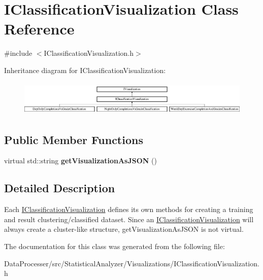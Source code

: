 \hypertarget{classIClassificationVisualization}{}\section{I\+Classification\+Visualization Class Reference}
\label{classIClassificationVisualization}


{\ttfamily \#include $<$I\+Classification\+Visualization.\+h$>$}

Inheritance diagram for I\+Classification\+Visualization\+:\begin{figure}[H]
\begin{center}
\leavevmode
\includegraphics[height=1.696970cm]{classIClassificationVisualization}
\end{center}
\end{figure}
\subsection*{Public Member Functions}
\begin{DoxyCompactItemize}
\item 
\mbox{\label{classIClassificationVisualization_a0ccbaa688c997957f8027a0ea74bcc6f}} 
virtual std\+::string {\bfseries get\+Visualization\+As\+J\+S\+ON} ()
\end{DoxyCompactItemize}


\subsection{Detailed Description}
Each \hyperlink{classIClassificationVisualization}{I\+Classification\+Visualization} defines its own methods for creating a training and result clustering/classified dataset. Since an \hyperlink{classIClassificationVisualization}{I\+Classification\+Visualization} will always create a cluster-\/like structure, \textquotesingle{}get\+Visualization\+As\+J\+S\+ON\textquotesingle{} is not virtual. 

The documentation for this class was generated from the following file\+:\begin{DoxyCompactItemize}
\item 
Data\+Processer/src/\+Statistical\+Analyzer/\+Visualizations/I\+Classification\+Visualization.\+h\end{DoxyCompactItemize}
